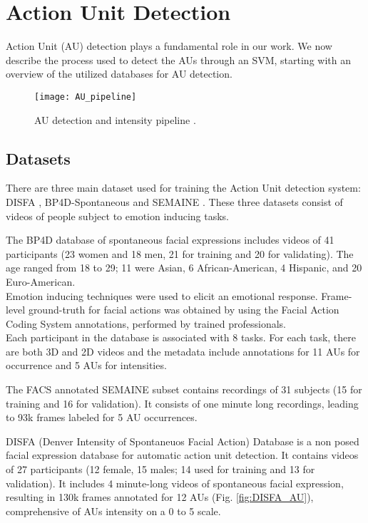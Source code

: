 \section{Action Unit Detection}
Action Unit (AU) detection plays a fundamental role in our work. We now describe the process used to detect the AUs through an SVM, starting with an overview of the utilized databases for AU detection.

\begin{figure}[H]
	\centering
	\texttt{[image: AU\_pipeline]}
	\caption{AU detection and intensity pipeline \cite{Baltru2015}.}
	\label{fig:AU_pipeline}
\end{figure}

\subsection{Datasets}
There are three main dataset used for training the Action Unit detection system: DISFA \cite{DISFA}, BP4D-Spontaneous \cite{BP4D-Spontaneous} and SEMAINE \cite{SEMAINE}. These three datasets consist of videos of people subject to emotion inducing tasks.

The BP4D database of spontaneous facial expressions includes videos of 41 participants (23 women and 18 men, 21 for training and 20 for validating). The age ranged from 18 to 29; 11 were Asian, 6 African-American, 4 Hispanic, and 20 Euro-American. \\
Emotion inducing techniques were used to elicit an emotional response. Frame-level ground-truth for facial actions was obtained by using the Facial Action Coding System annotations, performed by trained professionals. \\
Each participant in the database is associated with 8 tasks. For each task, there are both 3D and 2D videos and the metadata include annotations for 11 AUs for occurrence and 5 AUs for intensities.

The FACS annotated SEMAINE subset contains recordings of 31 subjects (15 for training and 16 for validation). It consists of one minute long recordings, leading to 93k frames labeled for 5 AU occurrences.

DISFA (Denver Intensity of Spontaneuos Facial Action) Database is a non posed facial expression database for automatic action unit detection. It contains videos of 27 participants (12 female, 15 males; 14 used for training and 13 for validation). It includes 4 minute-long videos of spontaneous facial expression, resulting in 130k frames annotated for 12 AUs (Fig. \ref{fig:DISFA_AU}), comprehensive of AUs intensity on a 0 to 5 scale.

